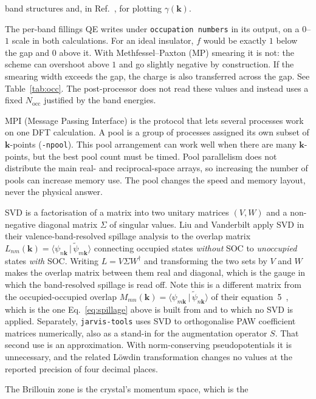 \documentclass[11pt]{article}
\newcommand{\braket}[2]{\langle #1 \,\vert\, #2 \rangle}
\newcommand{\Nocc}{N_{\mathrm{occ}}}
\newcommand{\kk}{\mathbf{k}}
\begin{document}
\begin{description}[leftmargin=0em,style=nextline,itemsep=2pt]
band structures and, in Ref.~\cite{liu2014}, for plotting $\gamma(\kk)$.
\item[Occupation numbers $f$] The per-band fillings QE writes under
\texttt{occupation numbers} in its output, on a $0$--$1$ scale in both calculations. For an ideal
insulator, $f$ would be exactly $1$ below the gap and $0$ above it. With Methfessel--Paxton (MP)
smearing it is not: the scheme can overshoot above $1$ and go slightly negative by construction. If
the smearing width exceeds the gap, the charge is also transferred across the gap. See
Table~\ref{tab:occ}. The
post-processor does not read these values and instead uses a fixed $\Nocc$ justified by the band energies.
\item[MPI / $\kk$-point pool] MPI (Message Passing Interface) is the protocol that lets several
processes work on one DFT calculation. A pool is a group of processes assigned its own subset of
$\kk$-points (\texttt{-npool}). This pool arrangement can work well when there are many $\kk$-points,
but the best pool count must be timed. Pool parallelism
does not distribute the main real- and reciprocal-space arrays, so increasing the number of pools can
increase memory use. The pool changes the speed and memory layout, never the physical answer.
\item[SVD (singular value decomposition)] SVD is a factorisation of a matrix into two unitary
matrices $(V,W)$ and a non-negative diagonal matrix $\Sigma$ of singular values. Liu and Vanderbilt
apply SVD in their valence-band-resolved spillage analysis to the overlap matrix
$L_{nm}(\kk)=\braket{\psi_{n\kk}}{\tilde\psi_{m\kk}}$ connecting occupied states \emph{without} SOC to
\emph{unoccupied} states \emph{with} SOC. Writing $L=V\Sigma W^{\dagger}$ and transforming the two
sets by $V$ and $W$ makes the overlap matrix between
them real and diagonal, which is the gauge in which the band-resolved spillage is read off. Note this
is a different matrix from the occupied-occupied overlap $M_{mn}(\kk)=\braket{\psi_{m\kk}}{\tilde\psi_{n\kk}}$
of their equation~5~\cite{liu2014}, which is the one Eq.~\eqref{eq:spillage} above is built from and to which no SVD is
applied. Separately, \texttt{jarvis-tools} uses SVD to orthogonalise PAW coefficient matrices
numerically, also as a stand-in for the augmentation operator $S$. That second use is an
approximation. With norm-conserving pseudopotentials it is unnecessary, and the related
L\"owdin transformation changes no values at the reported precision of four decimal places.
\item[$\kk$-point / Brillouin zone] The Brillouin zone is the crystal's momentum space, which is the

\end{description}
\end{document}
